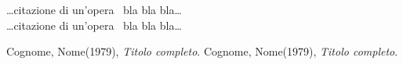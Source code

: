 \documentclass{book}
\begin{document}
\dots{}citazione di un'opera~\cite{autore1:titolo1} bla bla bla\dots{}
\\
\dots{}citazione di un'opera~\cite{autore2:titolo2} bla bla bla\dots{}

\cleardoublepage
{}

\begin{thebibliography}{9}

 Cognome, Nome(1979), \emph{Titolo completo}.
 Cognome, Nome(1979),
\emph {Titolo completo}.

\end{thebibliography}
\end{document}
